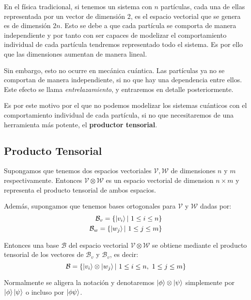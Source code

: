 En el física tradicional, si tenemos un sistema con $n$ partículas, cada una de ellas representada por un vector de dimensión 2, es el espacio vectorial que se genera es de dimensión $2n$. Esto se debe a que cada partícula se comporta de manera independiente y por tanto con ser capaces de modelizar el comportamiento individual de cada partícula tendremos representado todo el sistema. Es por ello que las dimensiones aumentan de manera lineal.

Sin embargo, esto no ocurre en mecánica cuántica. Las partículas ya no se comportan de manera independiente, si no que hay una dependencia entre ellos. Este efecto se llama \textit{entrelazamiento}, y entraremos en detalle posteriormente. 

Es por este motivo por el que no podemos modelizar los sistemas cuánticos con el comportamiento individual de cada partícula, si no que necesitaremos de una herramienta más potente, el \textbf{productor tensorial}.

\subsection{Producto Tensorial}

Supongamos que tenemos dos espacios vectoriales $\mathcal{V},\mathcal{W}$ de dimensiones $n$ y $m$ respectivamente. Entonces $\mathcal{V}\otimes\mathcal{W}$ es un espacio vectorial de dimension $n\times m$ y representa el producto tensorial de ambos espacios.

Además, supongamos que tenemos bases ortogonales para $\mathcal{V}$ y $\mathcal{W}$ dadas por:
\begin{equation}
\begin{split}
\mathcal{B}_v =\{\left|v_i\right\rangle |\ 1 \leq i \leq n \} \\
\mathcal{B}_w =\{\left|w_j\right\rangle |\ 1 \leq j \leq m \}
\end{split}
\end{equation}

Entonces una base $\mathcal{B}$ del espacio vectorial $\mathcal{V}\otimes\mathcal{W}$ se obtiene mediante el producto tensorial de los vectores de $\mathcal{B}_v$  y $\mathcal{B}_v$, es decir:
\begin{equation}
\mathcal{B} = \{\left|v_i\right\rangle\otimes\left|w_j\right\rangle|\ 1 \leq i \leq n,\ 1 \leq j \leq m \}
\end{equation}

Normalmente se aligera la notación y denotaremos $\left|\phi\right\rangle\otimes\left|\psi\right\rangle$ simplemente por $\left|\phi\right\rangle\left|\psi\right\rangle$ o incluso por $\left|\phi\psi\right\rangle$.

